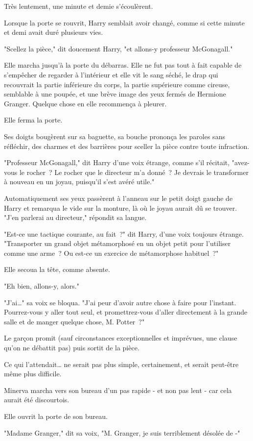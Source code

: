 Très lentement, une minute et demie s'écoulèrent.

\later

Lorsque la porte se rouvrit, Harry semblait avoir changé, comme si cette minute et demi avait duré plusieurs vies.

"Scellez la pièce," dit doucement Harry, "et allons-y professeur McGonagall."

Elle marcha jusqu'à la porte du débarras. Elle ne fut pas tout à fait capable de s'empêcher de regarder à l'intérieur et elle vit le sang séché, le drap qui recouvrait la partie inférieure du corps, la partie supérieure comme cireuse, semblable à une poupée, et une brève image des yeux fermés de Hermione Granger. Quelque chose en elle recommença à pleurer.

Elle ferma la porte.

Ses doigts bougèrent sur sa baguette, sa bouche prononça les paroles sans réfléchir, des charmes et des barrières pour sceller la pièce contre toute infraction.

"Professeur McGonagall," dit Harry d'une voix étrange, comme s'il récitait, "avez-vous le rocher~? Le rocher que le directeur m'a donné~? Je devrais le transformer à nouveau en un joyau, puisqu'il s'est avéré utile."

Automatiquement ses yeux passèrent à l'anneau sur le petit doigt gauche de Harry et remarqua le vide sur la monture, là où le joyau aurait dû se trouver. "J'en parlerai au directeur," répondit sa langue.

"Est-ce une tactique courante, au fait~?" dit Harry, d'une voix toujours étrange. "Transporter un grand objet métamorphosé en un objet petit pour l'utiliser comme une arme~? Ou est-ce un exercice de métamorphose habituel~?"

Elle secoua la tête, comme absente.

"Eh bien, allons-y, alors."

"J'ai…" sa voix se bloqua. "J'ai peur d'avoir autre chose à faire pour l'instant. Pourrez-vous y aller tout seul, et promettrez-vous d'aller directement à la grande salle et de manger quelque chose, M. Potter~?"

Le garçon promit (sauf circonstances exceptionnelles et imprévues, une clause qu'on ne débattit pas) puis sortit de la pièce.

Ce qui l'attendait… ne serait pas plus simple, certainement, et serait peut-être même plus difficile.

\later

Minerva marcha vers son bureau d'un pas rapide - et non pas lent - car cela aurait été discourtois.

Elle ouvrit la porte de son bureau.

"Madame Granger," dit sa voix, "M. Granger, je suis terriblement désolée de -" 
